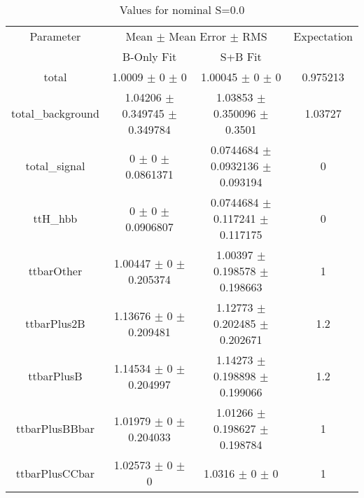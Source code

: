 \begin{table}
\centering
\caption{Values for nominal S=0.0}
\begin{tabular}{cccc}
\toprule
Parameter & \multicolumn{2}{c}{Mean $\pm$ Mean Error $\pm$ RMS} & Expectation\\
 & B-Only Fit & S+B Fit & \\
\midrule
total & \num{1.0009} $\pm$ \num{0} $\pm$ \num{0} & \num{1.00045} $\pm$ \num{0} $\pm$ \num{0} & \num{0.975213}\\
total\_background & \num{1.04206} $\pm$ \num{0.349745} $\pm$ \num{0.349784} & \num{1.03853} $\pm$ \num{0.350096} $\pm$ \num{0.3501} & \num{1.03727}\\
total\_signal & \num{0} $\pm$ \num{0} $\pm$ \num{0.0861371} & \num{0.0744684} $\pm$ \num{0.0932136} $\pm$ \num{0.093194} & \num{0}\\
ttH\_hbb & \num{0} $\pm$ \num{0} $\pm$ \num{0.0906807} & \num{0.0744684} $\pm$ \num{0.117241} $\pm$ \num{0.117175} & \num{0}\\
ttbarOther & \num{1.00447} $\pm$ \num{0} $\pm$ \num{0.205374} & \num{1.00397} $\pm$ \num{0.198578} $\pm$ \num{0.198663} & \num{1}\\
ttbarPlus2B & \num{1.13676} $\pm$ \num{0} $\pm$ \num{0.209481} & \num{1.12773} $\pm$ \num{0.202485} $\pm$ \num{0.202671} & \num{1.2}\\
ttbarPlusB & \num{1.14534} $\pm$ \num{0} $\pm$ \num{0.204997} & \num{1.14273} $\pm$ \num{0.198898} $\pm$ \num{0.199066} & \num{1.2}\\
ttbarPlusBBbar & \num{1.01979} $\pm$ \num{0} $\pm$ \num{0.204033} & \num{1.01266} $\pm$ \num{0.198627} $\pm$ \num{0.198784} & \num{1}\\
ttbarPlusCCbar & \num{1.02573} $\pm$ \num{0} $\pm$ \num{0} & \num{1.0316} $\pm$ \num{0} $\pm$ \num{0} & \num{1}\\
\bottomrule
\end{tabular}
\end{table}